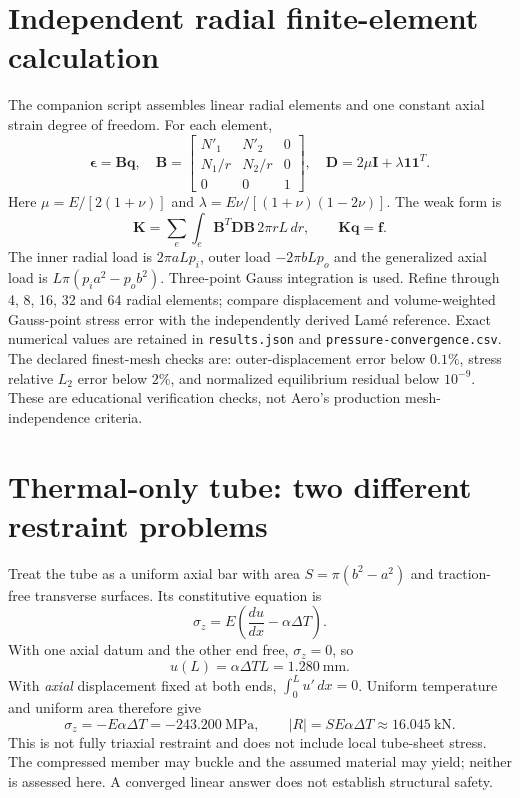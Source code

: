 \documentclass[11pt]{article}
\begin{document}
\section{Independent radial finite-element calculation}
The companion script assembles linear radial elements and one constant axial strain degree of freedom. For each element,
\begin{equation}
\boldsymbol\epsilon=\mathbf B\mathbf q,
\quad\mathbf B=\begin{bmatrix}N'_1&N'_2&0\\N_1/r&N_2/r&0\\0&0&1\end{bmatrix},
\quad\mathbf D=2\mu\mathbf I+\lambda\mathbf 1\mathbf 1^T.
\end{equation}
Here $\mu=E/[2(1+\nu)]$ and $\lambda=E\nu/[(1+\nu)(1-2\nu)]$. The weak form is
\begin{equation}
\mathbf K=\sum_e\int_e\mathbf B^T\mathbf D\mathbf B\,2\pi rL\,dr,
\qquad\mathbf K\mathbf q=\mathbf f.
\end{equation}
The inner radial load is $2\pi aLp_i$, outer load $-2\pi bLp_o$ and the generalized axial load is $L\pi(p_i a^2-p_o b^2)$. Three-point Gauss integration is used. Refine through 4, 8, 16, 32 and 64 radial elements; compare displacement and volume-weighted Gauss-point stress error with the independently derived Lam\'e reference. Exact numerical values are retained in \texttt{results.json} and \texttt{pressure-convergence.csv}.
\noindent The declared finest-mesh checks are: outer-displacement error below $0.1\%$, stress relative $L_2$ error below $2\%$, and normalized equilibrium residual below $10^{-9}$. These are educational verification checks, not Aero's production mesh-independence criteria.
\section{Thermal-only tube: two different restraint problems}
Treat the tube as a uniform axial bar with area $S=\pi(b^2-a^2)$ and traction-free transverse surfaces. Its constitutive equation is
\begin{equation}
\sigma_z=E\left(\frac{du}{dx}-\alpha\Delta T\right).
\end{equation}
With one axial datum and the other end free, $\sigma_z=0$, so
\begin{equation}
u(L)=\alpha\Delta T L=1.280\ \mathrm{mm}.
\end{equation}
With \emph{axial} displacement fixed at both ends, $\int_0^L u'\,dx=0$. Uniform temperature and uniform area therefore give
\begin{equation}
\sigma_z=-E\alpha\Delta T=-243.200\ \mathrm{MPa},
\qquad |R|=S E\alpha\Delta T\approx16.045\ \mathrm{kN}.
\end{equation}
This is not fully triaxial restraint and does not include local tube-sheet stress. The compressed member may buckle and the assumed material may yield; neither is assessed here. A converged linear answer does not establish structural safety.
\end{document}

